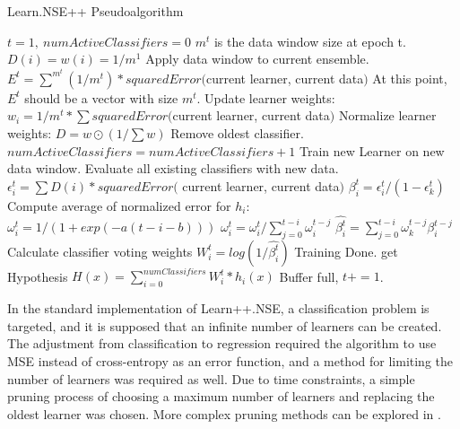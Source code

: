		\begin{algorithm}[ht]
		\caption{Learn.NSE++ Pseudoalgorithm}
		\label{code:bg_nse}
		\begin{algorithmic}[1]
			\State $t=1,\ numActiveClassifiers = 0$ 
			\State $m^t$ is the data window size at epoch t.
			\State $D(i) = w(i) = 1/m^1$
			\EndFor
			\Else
			\State Apply data window to current ensemble. 
			\State $E^t = \sum^{m^t}(1/m^t) * squaredError($current learner, current data$)$
			\State At this point, $E^t$ should be a vector with size $m^t$.
			\State Update learner weights: $w_i = 1/m^t * \sum squaredError($current learner, current data$)$
			\EndFor
			\State Normalize learner weights: $D = w \odot (1/\sum w)$
			\EndIf
			\State Remove oldest classifier.
			\Else
			 $numActiveClassifiers = numActiveClassifiers + 1$
			\EndIf
			\State Train new Learner on new data window.
			\State Evaluate all existing classifiers with new data.
			\State $\epsilon_i^t = \sum D(i) * squaredError($ current learner, current data$)$
			\State $\beta_i^t = \epsilon_i^t/(1-\epsilon_k^t) $
			\State Compute average of normalized error for $h_i$: $\omega_i^t = 1/(1+exp(-a(t-i-b)))$
			\State $\omega_i^t = \omega_i^t / \sum_{j=0}^{t-i} \omega_i^{t-j}$
			\State $\hat{\beta_i^t} = \sum_{j=0}^{t-i} \omega_k^{t-j} \beta_i^{t-j}$
			\State Calculate classifier voting weights $W_i^t = log(1/\hat{\beta_i^t})$
			\EndIf
			\EndFor
			\State Training Done.
			\State get Hypothesis $H(x) =\sum_{i=0}^{numClassifiers} W_i^t * h_i(x) $
			\EndWhile
			\State Buffer full, $t += 1$.
			\EndWhile
			\EndProcedure
		\end{algorithmic}
	\end{algorithm}
	\par In the standard implementation of Learn++.NSE, a classification problem is targeted, and it is supposed that an infinite number of learners can be created. The adjustment from classification to regression required the algorithm to use MSE instead of cross-entropy as an error function, and a method for limiting the number of learners was required as well. Due to time constraints, a simple pruning process of choosing a maximum number of learners and replacing the oldest learner was chosen. More complex pruning methods can be explored in \cite{PlaceholderCitation}.
